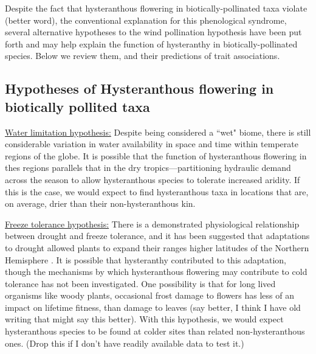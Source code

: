 \documentclass{article}[11pt]
\begin{document}
Despite the fact that  hysteranthous flowering in biotically-pollinated taxa violate (better word), the conventional explanation for this phenological syndrome, several alternative hypotheses to the wind pollination hypothesis have been put forth and may help explain the function of hysteranthy in biotically-pollinated species. Below we review them, and their predictions of trait associations.

\subsection*{Hypotheses of Hysteranthous flowering in biotically pollited taxa}
 
\underline{Water limitation hypothesis:} Despite being considered a ``wet" biome, there is still considerable variation in water availability in space and time within temperate regions of the globe. It is possible that the function of hysteranthous flowering in thes regions parallels that in the dry tropics---partitioning hydraulic demand across the season to allow hysteranthous species to tolerate increased aridity. If this is the case, we would expect to find hysteranthous taxa in locations that are, on average, drier than their non-hysteranthous kin.

\underline{Freeze tolerance hypothesis:} There is a demonstrated physiological relationship between drought and freeze tolerance, and it has been suggested that adaptations to drought allowed plants to expand their ranges higher latitudes of the Northern Hemisphere \citep{}. It is possible that hysteranthy contributed to this adaptation, though the mechanisms by which hysteranthous flowering may contribute to cold tolerance has not been investigated. One possibility is that for long lived organisms like woody plants, occasional frost damage to flowers has less of an impact on lifetime fitness, than damage to leaves (say better, I think I have old writing that might say this better). With this hypothesis, we would expect hysteranthous species to be found at colder sites than related non-hysteranthous ones. (Drop this if I don't have readily available data to test it.)
\end{document}
